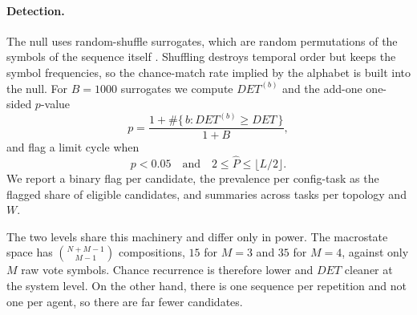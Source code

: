 \paragraph{Detection.}
The null uses random-shuffle surrogates, which are random permutations of the
symbols of the sequence itself \citep{theiler1992surrogate}. Shuffling destroys temporal
order but keeps the symbol frequencies, so the chance-match rate implied by the
alphabet is built into the null. For $B = 1000$ surrogates we compute $DET^{(b)}$
and the add-one one-sided $p$-value \citep{phipson2010permutation}
\begin{equation}
  p = \frac{1 + \#\{\,b : DET^{(b)} \geq DET\,\}}{1 + B},
\end{equation}
and flag a limit cycle when
\begin{equation}
  p < 0.05 \quad\text{and}\quad 2 \leq \hat{P} \leq \lfloor L/2 \rfloor .
\end{equation}
We report a binary flag per candidate, the prevalence per config-task as the
flagged share of eligible candidates, and summaries across tasks per topology and
$W$.

The two levels share this machinery and differ only in power. The macrostate space
has $\binom{N + M - 1}{M - 1}$ compositions, $15$ for $M = 3$ and $35$ for
$M = 4$, against only $M$ raw vote symbols. Chance recurrence is therefore lower
and $DET$ cleaner at the system level. On the other hand, there is one sequence per
repetition and not one per agent, so there are far fewer candidates.


